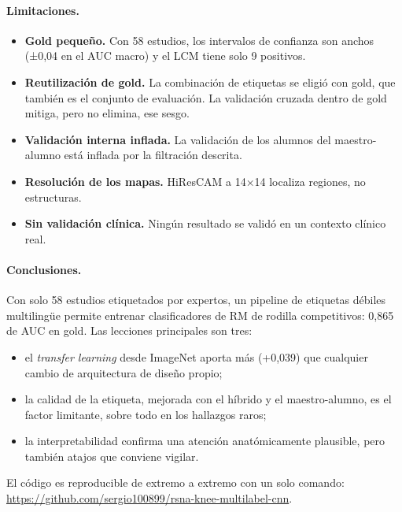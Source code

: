 \documentclass{article}
\begin{document}
\paragraph{Limitaciones.}
\begin{itemize}
  \item \textbf{Gold pequeño.} Con 58 estudios, los intervalos de confianza son anchos (±0,04 en el AUC macro) y el LCM tiene solo 9 positivos.
  \item \textbf{Reutilización de gold.} La combinación de etiquetas se eligió con gold, que también es el conjunto de evaluación. La validación cruzada dentro de gold mitiga, pero no elimina, ese sesgo.
  \item \textbf{Validación interna inflada.} La validación de los alumnos del maestro-alumno está inflada por la filtración descrita.
  \item \textbf{Resolución de los mapas.} HiResCAM a 14×14 localiza regiones, no estructuras.
  \item \textbf{Sin validación clínica.} Ningún resultado se validó en un contexto clínico real.
\end{itemize}

\paragraph{Conclusiones.} Con solo 58 estudios etiquetados por expertos, un pipeline de etiquetas débiles multilingüe permite entrenar clasificadores de RM de rodilla competitivos: 0,865 de AUC en gold. Las lecciones principales son tres:
\begin{itemize}
  \item el \emph{transfer learning} desde ImageNet aporta más (+0,039) que cualquier cambio de arquitectura de diseño propio;
  \item la calidad de la etiqueta, mejorada con el híbrido y el maestro-alumno, es el factor limitante, sobre todo en los hallazgos raros;
  \item la interpretabilidad confirma una atención anatómicamente plausible, pero también atajos que conviene vigilar.
\end{itemize}
El código es reproducible de extremo a extremo con un solo comando: \url{https://github.com/sergio100899/rsna-knee-multilabel-cnn}.



\end{document}
